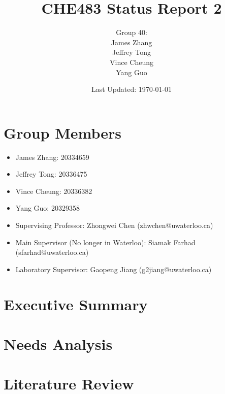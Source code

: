 \documentclass{article}
\begin{document}
	\title{CHE483 Status Report 2}
	\author{Group 40: \\James Zhang \\ Jeffrey Tong \\ Vince Cheung \\ Yang Guo }
	\date{Last Updated: \today}
	\maketitle
	\cleardoublepage
	\section{Group Members}
		\begin{itemize}
			\item	James Zhang: 20334659
			\item	Jeffrey Tong: 20336475
			\item	Vince Cheung: 20336382
			\item	Yang Guo: 20329358
			\item Supervising Professor: Zhongwei Chen (zhwchen@uwaterloo.ca)
			\item Main Supervisor (No longer in Waterloo): Siamak Farhad (sfarhad@uwaterloo.ca)
			\item Laboratory Supervisor: Gaopeng Jiang (g2jiang@uwaterloo.ca)
		\end{itemize}
	\section{Executive Summary}
	\section{Needs Analysis}
	\section{Literature Review}
\end{document}
